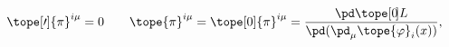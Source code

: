 \begin{equation}	\label{12.5}
\tope[\prime]{\pi}^{i\mu} = 0
\qquad
\tope{\pi}^{i\mu}
= \tope[0]{\pi}^{i\mu}
= \frac{\pd\tope[0\mspace{-3mu}]{L}} {\pd(\pd_\mu\tope{\varphi}_i(x))} ,
	\end{equation}

